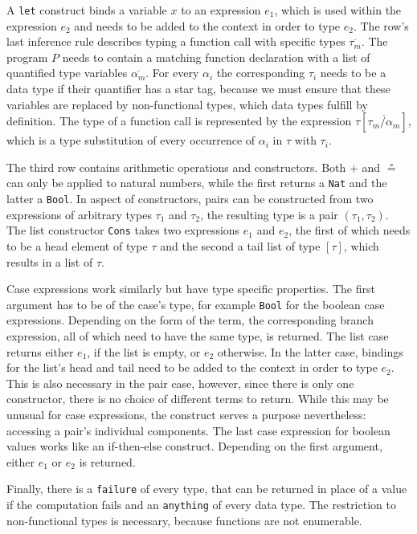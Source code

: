 \documentclass[fleqn]{scrreprt}
\begin{document}
A \texttt{let} construct binds a variable $x$ to an expression $e_{1}$, which is used within the expression $e_{2}$ and needs to be added to the context in order to type $e_{2}$. The row's last inference rule describes typing a function call with specific types $\overline{\tau_{m}}$. The program $P$ needs to contain a matching function declaration with a list of quantified type variables $\overline{\alpha_{m}}$. For every $\alpha_{i}$ the corresponding $\tau_{i}$ needs to be a data type if their quantifier has a star tag, because we must ensure that these variables are replaced by non-functional types, which data types fulfill by definition. The type of a function call is represented by the expression $\tau [\overline{\tau_{m}/\alpha_{m}}]$, which is a type substitution of every occurrence of $\alpha_{i}$ in $\tau$ with $\tau_{i}$.
\par
The third row contains arithmetic operations and constructors. Both $+$ and $\circeq$ can only be applied to natural numbers, while the first returns a \texttt{Nat} and the latter a \texttt{Bool}. In aspect of constructors, pairs can be constructed from two expressions of arbitrary types $\tau_{1}$ and $\tau_{2}$, the resulting type is a pair $(\tau_{1}, \tau_{2})$. The list constructor \texttt{Cons} takes two expressions $e_{1}$ and $e_{2}$, the first of which needs to be a head element of type $\tau$ and the second a tail list of type $[\tau]$, which results in a list of $\tau$.
\par
Case expressions work similarly but have type specific properties. The first argument has to be of the case's type, for example \texttt{Bool} for the boolean case expressions. Depending on the form of the term, the corresponding branch expression, all of which need to have the same type, is returned. The list case returns either $e_{1}$, if the list is empty, or $e_{2}$ otherwise. In the latter case, bindings for the list's head and tail need to be added to the context in order to type $e_{2}$. This is also necessary in the pair case, however, since there is only one constructor, there is no choice of different terms to return. While this may be unusual for case expressions, the construct serves a purpose nevertheless: accessing a pair's individual components. The last case expression for boolean values works like an if-then-else construct. Depending on the first argument, either $e_{1}$ or $e_{2}$ is returned.
\par
Finally, there is a \texttt{failure} of every type, that can be returned in place of a value if the computation fails and an \texttt{anything} of every data type. The restriction to non-functional types is necessary, because functions are not enumerable.\\
\end{document}

